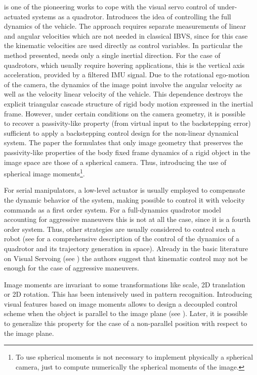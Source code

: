  \cite{hamel_2002} is one of the pioneering works to cope with the visual servo control of under-actuated systems as a quadrotor. Introduces the idea of controlling the full dynamics of the vehicle. The approach requires separate measurements of linear and angular velocities which are not needed in classical IBVS, since for this case the kinematic velocities are used directly as control variables. In particular the method presented, needs only a single inertial direction. For the case of quadrotors, which usually require hovering applications, this is the vertical axis acceleration, provided by a filtered IMU signal. Due to the rotational ego-motion of the camera, the dynamics of the image point involve the angular velocity as well as the velocity linear velocity of the vehicle. This dependence destroys the explicit triangular cascade structure of rigid body motion expressed in the inertial frame. However, under certain conditions on the camera geometry, it is possible to recover a passivity-like property (from virtual input to the backstepping error) sufficient to apply a backstepping control design for the non-linear dynamical system. The paper the formulates that only image geometry that preserves the passivity-like properties of the body fixed frame dynamics of a rigid object in the image space are those of a spherical camera. Thus, introducing the use of spherical image moments\footnote{To use spherical moments is not necessary to implement physically a spherical camera, just to compute numerically the spherical moments of the image.}.

For serial manipulators, a low-level actuator is usually employed to compensate the dynamic behavior of the system, making possible to control it with velocity commands as a first order system. For a full-dynamics quadrotor model accounting for aggressive maneuvers this is not at all the case, since it is a fourth order system. Thus, other strategies are usually considered to control such a robot (see \cite{Mellinger} for a comprehensive description of the control of the dynamics of a quadrotor and its trajectory generation in space). Already in the basic literature on Visual Servoing (see \cite{chaumette_visual_2007}) the authors suggest that kinematic control may not be enough for the case of aggressive maneuvers. 

Image moments are invariant to some transformations like scale, 2D translation or 2D rotation. This has been intensively used in pattern recognition. Introducing visual features based on image moments allows to design a decoupled control scheme when the object is parallel to the image plane (see \cite{tahri_2005}). Later, it is possible to generalize this property for the case of a non-parallel position with respect to the image plane.

